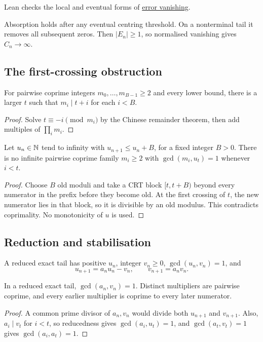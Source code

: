\documentclass[11pt]{article}
\begin{document}
\noindent Lean checks the local and eventual forms of \href{https://github.com/wcook04/plectis-erdos/blob/f36a98bf3d3e6f65f1074e3b800e3293d5b8a51a/ErdosProblems/Erdos243/PaperCompleteR7/Arithmetic.lean#L138}{error vanishing}.

Absorption holds after any eventual centring threshold. On a nonterminal
tail it removes all subsequent zeros. Then $|E_n|\ge1$, so normalised
vanishing gives $C_n\to\infty$.

\subsection{The first-crossing obstruction}\label{sec:barrier}
\begin{lemma}\label{res:crt}
For pairwise coprime integers $m_0,\ldots,m_{B-1}\ge2$ and every lower
bound, there is a larger $t$ such that $m_i\mid t+i$ for each $i<B$.
\end{lemma}
\begin{proof}
Solve $t\equiv-i\pmod{m_i}$ by the Chinese remainder theorem, then add
multiples of $\prod_i m_i$.
\end{proof}

\begin{theorem}\label{res:barrier}
Let $u_n\in\mathbb{N}$ tend to infinity with $u_{n+1}\le u_n+B$, for a fixed
integer $B>0$. There is no infinite pairwise coprime family $m_i\ge2$
with $\gcd(m_i,u_t)=1$ whenever $i<t$.
\end{theorem}
\begin{proof}
Choose $B$ old moduli and take a CRT block $[t,t+B)$ beyond every numerator
in the prefix before they become old. At the first crossing of $t$, the
new numerator lies in that block, so it is divisible by an old modulus.
This contradicts coprimality. No monotonicity of $u$ is used.
\end{proof}

\subsection{Reduction and stabilisation}
A reduced exact tail has positive $u_n$, integer $v_n\ge0$,
$\gcd(u_n,v_n)=1$, and
\[
 u_{n+1}=a_nu_n-v_n,\qquad v_{n+1}=a_nv_n.
\]
\begin{proposition}\label{res:reduced}
In a reduced exact tail, $\gcd(a_n,v_n)=1$. Distinct multipliers are
pairwise coprime, and every earlier multiplier is coprime to every later
numerator.
\end{proposition}
\begin{proof}
A common prime divisor of $a_n,v_n$ would divide both $u_{n+1}$ and
$v_{n+1}$. Also, $a_i\mid v_t$ for $i<t$, so reducedness gives
$\gcd(a_i,u_t)=1$, and $\gcd(a_t,v_t)=1$ gives
$\gcd(a_i,a_t)=1$.
\end{proof}
\end{document}
